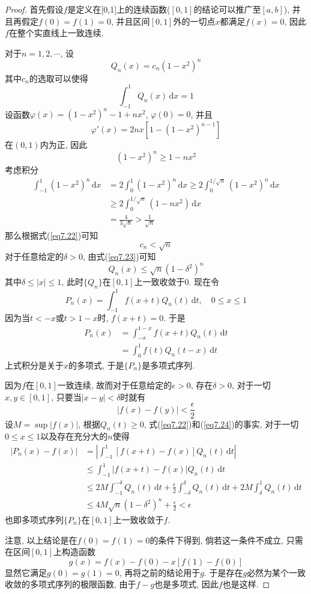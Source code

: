 \documentclass[cn,12pt,math=mtpro2,citestyle=gb7714-2015,bibstyle=gb7714-2015,twocol]{elegantbook}
\newcommand{\dx}{\,\text{d}x}
\newcommand{\dt}{\,\text{d}t}
\begin{document}
\begin{proof}
  首先假设$f$是定义在[0,1]上的连续函数($[0,1]$的结论可以推广至$[a,b]$), 并且再假定$f(0)=f(1)=0$, 并且区间$[0,1]$外的一切点$x$都满足$f(x)=0$, 因此$f$在整个实直线上一致连续.

  对于$n=1,2,\cdots$, 设
  $$Q_n(x)=c_n(1-x^2)^n$$
  其中$c_n$的选取可以使得
  \begin{equation}\label{eq7.22}
    \int_{-1}^{1}Q_n(x)\dx=1
  \end{equation}
  设函数$\varphi(x)=(1-x^2)^n-1+nx^2$, $\varphi(0)=0$, 并且
  $$\varphi'(x)=2nx[1-(1-x^2)^{n-1}]$$
  在$(0,1)$内为正, 因此
  $$(1-x^2)^n\geq1-nx^2$$
  考虑积分
  \begin{align*}
  \int_{-1}^{1}(1-x^2)^n\dx&=2\int_{0}^{1}(1-x^2)^n\dx\geq 2\int_{0}^{1/\sqrt{n}}(1-x^2)^n\dx \\
  &\geq 2\int_{0}^{1/\sqrt{n}}(1-nx^2)\dx \\
  &=\frac{4}{3\sqrt{n}}>\frac{1}{\sqrt{n}}
  \end{align*}
  那么根据式(\ref{eq7.22})可知
  \begin{equation}\label{eq7.23}
   c_n<\sqrt{n}
  \end{equation}
  对于任意给定的$\delta>0$, 由式(\ref{eq7.23})可知
  \begin{equation}\label{eq7.24}
    Q_n(x)\leq\sqrt{n}(1-\delta^2)^n
  \end{equation}
  其中$\delta\leq|x|\leq1$, 此时$\{Q_n\}$在$[0,1]$上一致收敛于0. 现在令
  $$P_n(x)=\int_{-1}^{1}f(x+t)Q_n(t)\dt, \quad 0\leq x\leq 1$$
  因为当$t<-x$或$t>1-x$时, $f(x+t)=0$. 于是
  \begin{align*}
  P_n(x)&=\int_{-x}^{1-x}f(x+t)Q_n(t)\dt \\
  &=\int_{0}^{1}f(t)Q_n(t-x)\dt
  \end{align*}
  上式积分是关于$x$的多项式, 于是$\{P_n\}$是多项式序列.

  因为$f$在$[0,1]$一致连续, 故而对于任意给定的$\epsilon>0$, 存在$\delta>0$, 对于一切$x,y\in[0,1]$, 只要当$|x-y|<\delta$时就有
  $$|f(x)-f(y)|<\frac{\epsilon}{2}$$
  设$M=\sup |f(x)|$, 根据$Q_n(t)\geq0$, 式(\ref{eq7.22})和(\ref{eq7.24})的事实, 对于一切$0\leq x\leq 1$以及存在充分大的$n$使得
  \begin{align*}
  |P_n(x)-f(x)|&=\left|\int_{-1}^{1}[f(x+t)-f(x)]Q_n(t)\dt \right| \\
  &\leq \int_{-1}^{1}|f(x+t)-f(x)|Q_n(t)\dt \\
  &\leq 2M\int_{-1}^{-\delta}Q_n(t)\dt+\frac{\epsilon}{2}\int_{-\delta}^{\delta}Q_n(t)\dt+2M\int_{\delta}^{1}Q_n(t)\dt \\
  &\leq 4M\sqrt{n}(1-\delta^2)^n+\frac{\epsilon}{2}<\epsilon
  \end{align*}
  也即多项式序列$\{P_n\}$在$[0,1]$上一致收敛于$f$.

  注意, 以上结论是在$f(0)=f(1)=0$的条件下得到, 倘若这一条件不成立, 只需在区间$[0,1]$上构造函数
  $$g(x)=f(x)-f(0)-x[f(1)-f(0)]$$
  显然它满足$g(0)=g(1)=0$, 再将之前的结论用于$g$. 于是存在$g$必然为某个一致收敛的多项式序列的极限函数, 由于$f-g$也是多项式, 因此$f$也是这样.
\end{proof}
\end{document}
